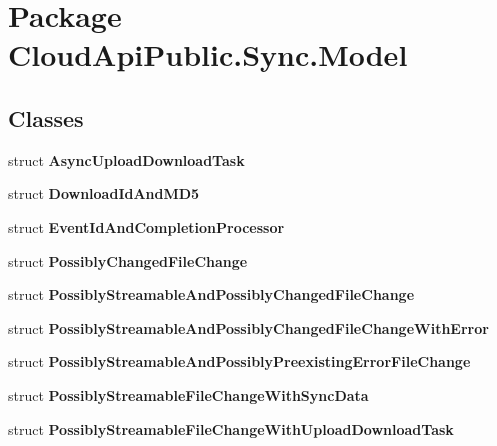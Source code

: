 \hypertarget{namespace_cloud_api_public_1_1_sync_1_1_model}{\section{Package Cloud\-Api\-Public.\-Sync.\-Model}
\label{namespace_cloud_api_public_1_1_sync_1_1_model}
}
\subsection*{Classes}
\begin{DoxyCompactItemize}
\item 
struct {\bfseries Async\-Upload\-Download\-Task}
\item 
struct {\bfseries Download\-Id\-And\-M\-D5}
\item 
struct {\bfseries Event\-Id\-And\-Completion\-Processor}
\item 
struct {\bfseries Possibly\-Changed\-File\-Change}
\item 
struct {\bfseries Possibly\-Streamable\-And\-Possibly\-Changed\-File\-Change}
\item 
struct {\bfseries Possibly\-Streamable\-And\-Possibly\-Changed\-File\-Change\-With\-Error}
\item 
struct {\bfseries Possibly\-Streamable\-And\-Possibly\-Preexisting\-Error\-File\-Change}
\item 
struct {\bfseries Possibly\-Streamable\-File\-Change\-With\-Sync\-Data}
\item 
struct {\bfseries Possibly\-Streamable\-File\-Change\-With\-Upload\-Download\-Task}
\end{DoxyCompactItemize}

